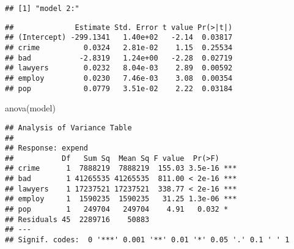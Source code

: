 \documentclass[
  11pt,
]{article}
\newenvironment{Shaded}{\begin{snugshade}}{\end{snugshade}}
\newcommand{\AttributeTok}[1]{\textcolor[rgb]{0.77,0.63,0.00}{#1}}
\newcommand{\CommentTok}[1]{\textcolor[rgb]{0.56,0.35,0.01}{\textit{#1}}}
\newcommand{\FunctionTok}[1]{\textcolor[rgb]{0.00,0.00,0.00}{#1}}
\newcommand{\NormalTok}[1]{#1}
\newcommand{\OtherTok}[1]{\textcolor[rgb]{0.56,0.35,0.01}{#1}}
\newcommand{\SpecialCharTok}[1]{\textcolor[rgb]{0.00,0.00,0.00}{#1}}
\begin{document}
\begin{verbatim}
## [1] "model 2:"
\end{verbatim}

\begin{Shaded}
\end{Shaded}

\begin{verbatim}
##              Estimate Std. Error t value Pr(>|t|)
## (Intercept) -299.1341   1.40e+02   -2.14  0.03817
## crime          0.0324   2.81e-02    1.15  0.25534
## bad           -2.8319   1.24e+00   -2.28  0.02719
## lawyers        0.0232   8.04e-03    2.89  0.00592
## employ         0.0230   7.46e-03    3.08  0.00354
## pop            0.0779   3.51e-02    2.22  0.03184
\end{verbatim}

\begin{Shaded}
\begin{Highlighting}[]
\FunctionTok{anova}\NormalTok{(model)}
\end{Highlighting}
\end{Shaded}

\begin{verbatim}
## Analysis of Variance Table
## 
## Response: expend
##           Df   Sum Sq  Mean Sq F value  Pr(>F)    
## crime      1  7888219  7888219  155.03 3.5e-16 ***
## bad        1 41265535 41265535  811.00 < 2e-16 ***
## lawyers    1 17237521 17237521  338.77 < 2e-16 ***
## employ     1  1590235  1590235   31.25 1.3e-06 ***
## pop        1   249704   249704    4.91   0.032 *  
## Residuals 45  2289716    50883                    
## ---
## Signif. codes:  0 '***' 0.001 '**' 0.01 '*' 0.05 '.' 0.1 ' ' 1
\end{verbatim}

\begin{Shaded}
\end{Shaded}
\end{document}
